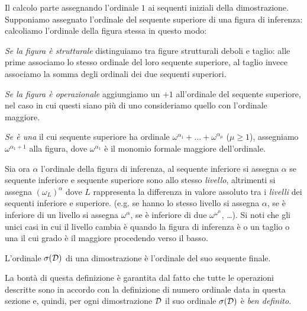 		Il calcolo parte assegnando l'ordinale $1$ ai sequenti iniziali della dimostrazione. Supponiamo assegnato l'ordinale del sequente superiore di una figura di inferenza: calcoliamo l'ordinale della figura stessa in questo modo:
		
		\emph{Se la figura è strutturale} distinguiamo tra figure strutturali deboli e taglio: alle prime associamo lo stesso ordinale del loro sequente superiore, al taglio invece associamo la somma degli ordinali dei due sequenti superiori.
		
		\emph{Se la figura è operazionale} aggiungiamo un $+1$ all'ordinale del sequente superiore, nel caso in cui questi siano più di uno consideriamo quello con l'ordinale maggiore.
		
		\emph{Se è una } il cui sequente superiore ha ordinale $\omega^{\alpha_{1}} + \ldots + \omega^{\alpha_{\mu}}$ ($\mu\ge 1$), assegniamo $\omega^{\alpha_{1}+1}$ alla figura, dove $\omega^{\alpha_{1}}$ è il monomio formale maggiore dell'ordinale.
		
		Sia ora $\alpha$ l'ordinale della figura di inferenza, al sequente inferiore si assegna $\alpha$ se sequente inferiore e sequente superiore sono allo stesso \emph{livello}, altrimenti si assegna $(\omega_{L})^{\alpha}$ dove $L$ rappresenta la differenza in valore assoluto tra i \emph{livelli} dei sequenti inferiore e superiore. (e.g. se hanno lo stesso livello si assegna $\alpha$, se è inferiore di un livello si assegna $\omega^{\alpha}$, se è inferiore di due $\omega^{\omega^{\alpha}}$, \ldots). Si noti che gli unici casi in cui il livello cambia è quando la figura di inferenza è o un taglio o una  il cui grado è il maggiore procedendo verso il basso.
	\begin{defin}
		L'ordinale $\sigma(\mathcal{D})$ di una dimostrazione è l'ordinale del suo sequente finale.
	\end{defin}
		La bontà di questa definizione è garantita dal fatto che tutte le operazioni descritte sono in accordo con la definizione di numero ordinale data in questa sezione e, quindi, per ogni dimostrazione $\mathcal{D}$ il suo ordinale $\sigma(\mathcal{D})$ è \emph{ben definito}.
	\begin{comment}
		NOTA: le dimostrazioni semplici sono le sole con ordinale "basso"? i.e. tutte le dimostrazioni con ordinale sotto ad un certo valore sono tutte semplici? Altrimenti non ho concluso nulla perché potrei arrivare ad una dimostrazione con ordinale 0 ma non "semplice" e quindi nessuno mi garantirebbe la sua consistenza...
		(equivale a: qualsiasi dimostrazione che NON sia semplice ha ordinale maggiore di una dimostrazione semplice?)
	\end{comment}
